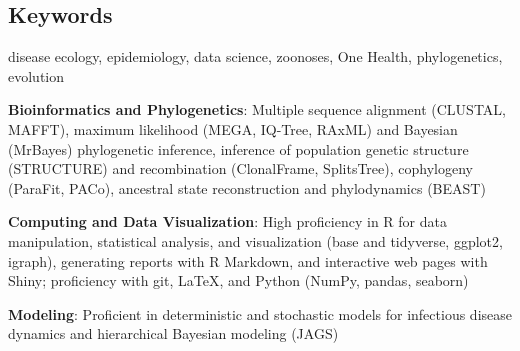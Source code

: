 \documentclass{cv}
\begin{document}
\subsection*{Keywords}

disease ecology, epidemiology, data science, zoonoses, One Health, phylogenetics, evolution


\textbf{Bioinformatics and Phylogenetics}: Multiple sequence alignment (CLUSTAL, MAFFT), maximum likelihood (MEGA, IQ-Tree, RAxML) and Bayesian (MrBayes) phylogenetic inference, inference of population genetic structure (STRUCTURE) and recombination (ClonalFrame, SplitsTree), cophylogeny (ParaFit, PACo), ancestral state reconstruction and phylodynamics (BEAST)

\textbf{Computing and Data Visualization}: High proficiency in R for data manipulation, statistical analysis, and visualization (base and tidyverse, ggplot2, igraph), generating reports with R Markdown, and interactive web pages with Shiny; proficiency with git, \LaTeX, and Python (NumPy, pandas, seaborn)

\textbf{Modeling}: Proficient in deterministic and stochastic models for infectious disease dynamics and hierarchical Bayesian modeling (JAGS)
\end{document}
